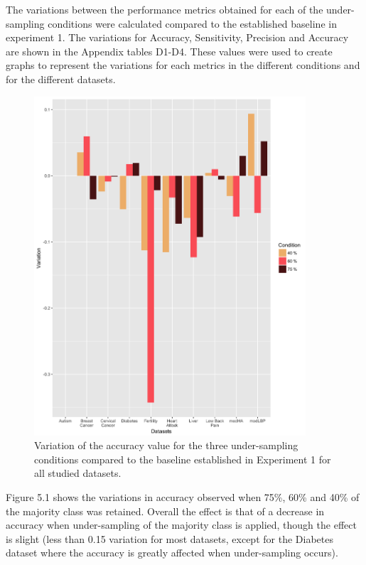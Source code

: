 The variations between the performance metrics obtained for each of the under-sampling conditions were calculated compared to the established baseline in experiment 1.\newline
The variations for Accuracy, Sensitivity, Precision and Accuracy are shown in the Appendix tables D1-D4.
These values were used to create graphs to represent the variations for each metrics in the different conditions and for the different datasets.\newline


\begin{figure}[!htbp]
    \centering
    \includegraphics[width=0.9\textwidth]{ThesisTemplate/usingLatex/chapter5Images/AccuVariationUnderBySets.png}
    \caption{Variation of the accuracy value for the three under-sampling conditions compared to the baseline established in Experiment 1 for all studied datasets.}
    \label{fig:my_label}
\end{figure}

Figure 5.1 shows the variations in accuracy observed when 75\%, 60\% and 40\% of the majority class was retained.
Overall the effect is that of a decrease in accuracy when under-sampling of the  majority class is applied, though the effect is slight (less than 0.15 variation for most datasets, except for the Diabetes dataset where the accuracy is greatly affected when under-sampling occurs).\newline



